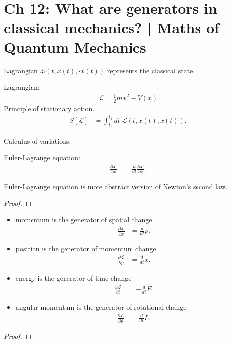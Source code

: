 \documentclass[../../note.tex]{subfiles}
\begin{document}
\section{Ch 12: What are generators in classical mechanics? | Maths of Quantum Mechanics}
Lagrangian $\mathcal{L}(t,x(t), \cdot{x}(t))$ represents the classical state.

Lagrangian:
\begin{align}
  \mathcal{L} = \frac{1}{2} m \dot{x}^2 - V(x)
\end{align}
Principle of stationary action.
\begin{align}
  S[\mathcal{L}]
  &= \int_{t_i}^{t_f} dt~\mathcal{L}(t,x(t),\dot{x}(t)).
\end{align}

Calculus of variations.

Euler-Lagrange equation:
\begin{align}
  \frac{\partial \mathcal{L}}{\partial x}
  &= \frac{d}{d t} \frac{\partial \mathcal{L}}{\partial \dot{x}}.
\end{align}

\begin{theorem}
  Euler-Lagrange equation is more abstract version of Newton's second law.
\end{theorem}
\begin{proof}
  
\end{proof}

\begin{theorem}
  \begin{itemize}
    \item momentum is the generator of spatial change
    \begin{align}
      \frac{\partial \mathcal{L}}{\partial x}
      &= \frac{d}{d t} p.
    \end{align}
    \item position is the generator of momentum change
    \begin{align} 
      \frac{\partial \mathcal{L}}{\partial p}
      &= \frac{d}{d t} x.
    \end{align}
    \item energy is the generator of time change
    \begin{align}
      \frac{\partial \mathcal{L}}{\partial t}
      &= - \frac{d}{d t} E.
    \end{align}
    \item angular momentum is the generator of rotational change
    \begin{align}
      \frac{\partial \mathcal{L}}{\partial \theta}
      &= \frac{d}{d t} L.
    \end{align}
  \end{itemize}
\end{theorem}
\begin{proof}
  
\end{proof}
\end{document}
